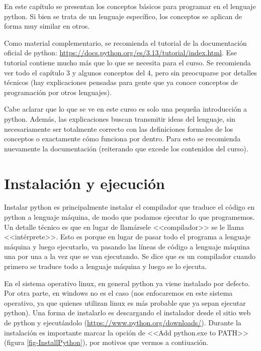\documentclass[a4paper, 12pt]{report}
\theoremstyle{definition}
\begin{document}
En este capítulo se presentan los conceptos básicos para programar en el lenguaje python. Si bien se trata de un lenguaje específico, los conceptos se aplican de forma muy similar en otros.

Como material complementario, se recomienda el tutorial de la documentación oficial de python: \href{https://docs.python.org/es/3.13/tutorial/index.html}{https://docs.python.org/es/3.13/tutorial/index.html}. Ese tutorial contiene mucho más que lo que se necesita para el curso. Se recomienda ver todo el capítulo 3 y algunos conceptos del 4, pero sin preocuparse por detalles técnicos (hay explicaciones pensadas para gente que ya conoce conceptos de programación por otros lenguajes).

Cabe aclarar que lo que se ve en este curso es solo una pequeña introducción a python. Además, las explicaciones buscan transmitir ideas del lenguaje, sin necesariamente ser totalmente correcto con las definiciones formales de los conceptos o exactamente cómo funciona por dentro. Para esto se recomienda nuevamente la documentación (reiterando que excede los contenidos del curso).

\section{Instalación y ejecución}\label{sec-instalyEjec}

Instalar python es principalmente instalar el compilador que traduce el código en python a lenguaje máquina, de modo que podamos ejecutar lo que programemos. Un detalle técnico es que en lugar de llamársele <<compilador>> se le llama <<intérprete>>. Esto es porque en lugar de pasar todo el programa a lenguaje máquina y luego ejecutarlo, va pasando las líneas de código a lenguaje máquina una por una a la vez que se van ejecutando. Se dice que es un compilador cuando primero se traduce todo a lenguaje máquina y luego se lo ejecuta.

En el sistema operativo linux, en general python ya viene instalado por defecto. Por otra parte, en windows no es el caso (nos enfocaremos en este sistema operativo, ya que quienes utilizan linux es más probable que ya sepan ejecutar python). Una forma de instalarlo es descargando el instalador desde el sitio web de python y ejecutándolo (\href{https://www.python.org/downloads/}{https://www.python.org/downloads/}). Durante la instalación es importante marcar la opción de <<Add python.exe to PATH>> (figura \ref{fig-InstallPython}), por motivos que vermos a contiuación.
\end{document}
